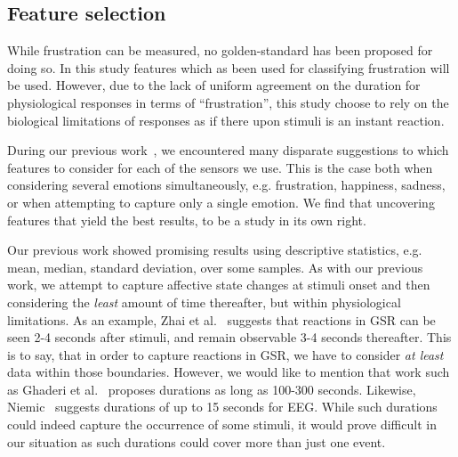 \subsection{Feature selection}

While frustration can be measured, no golden-standard has been proposed for doing so.  In this study features which as
been used for classifying frustration will be used.  However, due to the lack of uniform agreement on the duration for
physiological responses in terms of ``frustration'', this study choose to rely on the biological limitations of
responses as if there upon stimuli is an instant reaction.

During our previous work~\cite{9th_semester_project}, we encountered many disparate suggestions to which features to
consider for each of the sensors we use. This is the case both when considering several emotions simultaneously,
e.g. frustration, happiness, sadness, or when attempting to capture only a single emotion. We find that uncovering
features that yield the best results, to be a study in its own right.

Our previous work showed promising results using descriptive statistics, e.g. mean, median, standard deviation, over
some samples. As with our previous work, we attempt to capture affective state changes at stimuli onset and then
considering the \textit{least} amount of time thereafter, but within physiological limitations. As an example, Zhai et
al.~\cite{gsr_len_lat3} suggests that reactions in GSR can be seen 2-4 seconds after stimuli, and remain observable 3-4
seconds thereafter. This is to say, that in order to capture reactions in GSR, we have to consider \textit{at least}
data within those boundaries. However, we would like to mention that work such as Ghaderi et
al.~\cite{machine_learning_100s_gsr} proposes durations as long as 100-300 seconds. Likewise,
Niemic~\cite{studies_of_emotion} suggests durations of up to 15 seconds for EEG. While such durations could indeed
capture the occurrence of some stimuli, it would prove difficult in our situation as such durations could cover more
than just one event.

